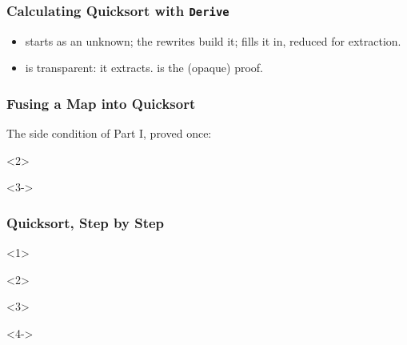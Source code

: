 
\begin{frame*}
  \frametitle{Calculating Quicksort with \texttt{Derive}}
  \begin{itemize}
    \item {} starts as an unknown; the rewrites build it;
       fills it in, reduced for extraction.
    \item {} is transparent: it extracts.  is
      the (opaque) proof.
  \end{itemize}
\end{frame*}

\begin{frame*}[vertical-alignment = top]
  \frametitle{Fusing a Map into Quicksort}
  \vspace*{3mm}
  The side condition of Part I, proved once:
  \begin{onlyenv}<2>
  \end{onlyenv}
  \begin{onlyenv}<3->
  \end{onlyenv}
  \par
\end{frame*}

\begin{frame*}[vertical-alignment = top]
  \frametitle{Quicksort, Step by Step}
  \vspace*{4mm}
  \begin{onlyenv}<1>
  \end{onlyenv}
  \begin{onlyenv}<2>
  \end{onlyenv}
  \begin{onlyenv}<3>
  \end{onlyenv}
  \begin{onlyenv}<4->
  \end{onlyenv}
  \par
\end{frame*}

